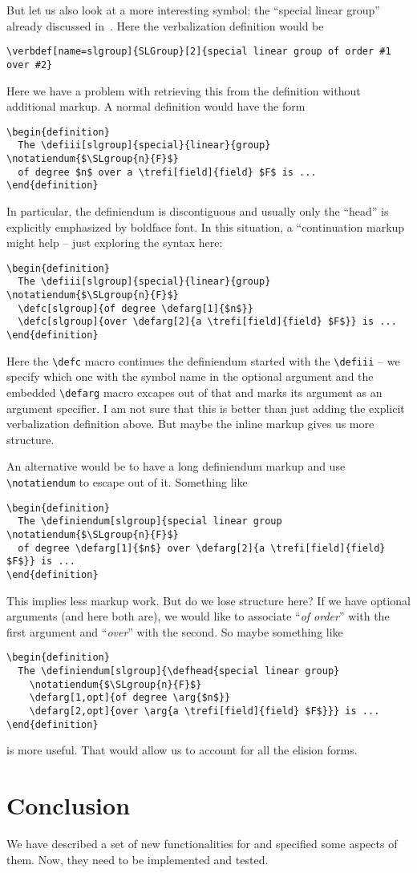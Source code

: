 \documentclass{bluenote}
\def\nlex#1{``\emph{#1}''}
\begin{document}
But let us also look at a more interesting symbol: the ``special linear group'' already
discussed in~\cite{Kohlhase:dmsmglom14}. Here the \sTeX verbalization definition would be 
\begin{lstlisting}
\verbdef[name=slgroup]{SLGroup}[2]{special linear group of order #1 over #2}
\end{lstlisting}
Here we have a problem with retrieving this from the definition without additional
markup. A normal definition would have the form
\begin{lstlisting}
\begin{definition}
  The \defiii[slgroup]{special}{linear}{group} \notatiendum{$\SLgroup{n}{F}$}
  of degree $n$ over a \trefi[field]{field} $F$ is ...
\end{definition}
\end{lstlisting}
In particular, the definiendum is discontiguous and usually only the ``head'' is
explicitly emphasized by boldface font. In this situation, a ``continuation markup might
help -- just exploring the syntax here:
\begin{lstlisting}
\begin{definition}
  The \defiii[slgroup]{special}{linear}{group} \notatiendum{$\SLgroup{n}{F}$}
  \defc[slgroup]{of degree \defarg[1]{$n$}} 
  \defc[slgroup]{over \defarg[2]{a \trefi[field]{field} $F$}} is ...
\end{definition}
\end{lstlisting}
Here the \lstinline|\defc| macro continues the definiendum started with the
\lstinline|\defiii| -- we specify which one with the symbol name in the optional argument
and the embedded \lstinline|\defarg| macro excapes out of that and marks its argument as
an argument specifier. I am not sure that this is better than just adding the explicit
verbalization definition above. But maybe the inline markup gives us more structure.

An alternative would be to have a long definiendum markup and use \lstinline|\notatiendum|
to escape out of it. Something like 
\begin{lstlisting}
\begin{definition}
  The \definiendum[slgroup]{special linear group \notatiendum{$\SLgroup{n}{F}$}
  of degree \defarg[1]{$n$} over \defarg[2]{a \trefi[field]{field} $F$}} is ...
\end{definition}
\end{lstlisting}
This implies less markup work. But do we lose structure here? If we have optional
arguments (and here both are), we would like to associate \nlex{of order} with the first
argument and \nlex{over} with the second. So maybe something like 
\begin{lstlisting}
\begin{definition}
  The \definiendum[slgroup]{\defhead{special linear group} 
    \notatiendum{$\SLgroup{n}{F}$}
    \defarg[1,opt]{of degree \arg{$n$}} 
    \defarg[2,opt]{over \arg{a \trefi[field]{field} $F$}}} is ...
\end{definition}
\end{lstlisting}
is more useful. That would allow us to account for all the elision forms.

\section{Conclusion}
We have described a set of new functionalities for \sTeX and specified some aspects of
them. Now, they need to be implemented and tested. 

\printbibliography
\end{document}
